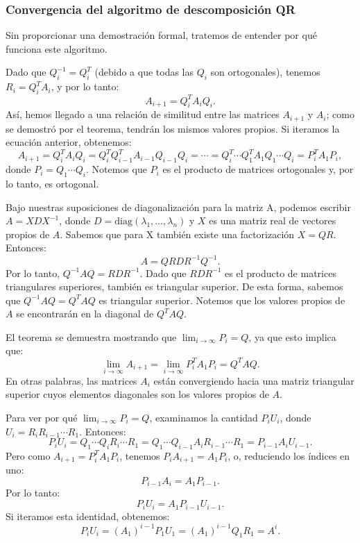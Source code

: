 \subsubsection{Convergencia del algoritmo de descomposición QR}
Sin proporcionar una demostración formal, tratemos de entender por qué funciona este algoritmo.
 
Dado que \( Q_i^{-1} = Q_i^T \) (debido a que todas las $Q_i$ son ortogonales), tenemos \( R_i = Q_i^T A_i \), y por lo tanto:
\[
A_{i+1} = Q_i^T A_i Q_i.
\]
Así, hemos llegado a una relación de similitud entre las matrices $A_ {i+1} $ y $A_i$; como se demostró por el teorema,  tendrán los mismos valores propios. Si iteramos la ecuación anterior, obtenemos:
\[
A_{i+1} = Q_i^T A_i Q_i = Q_i^T Q_{i-1}^T A_{i-1} Q_{i-1} Q_i = \cdots = Q_i^T \cdots Q_1^T A_1 Q_1 \cdots Q_i = P_i^T A_1 P_i,
\]
donde \( P_i = Q_1 \cdots Q_i \). Notemos que \( P_i \) es el producto de matrices ortogonales y, por lo tanto, es ortogonal.

Bajo nuestras suposiciones de diagonalización para la matriz A, podemos escribir \( A = X D X^{-1} \), donde \( D = \text{diag}(\lambda_1, \ldots, \lambda_n) \) y \( X \) es una matriz real de vectores propios de \( A \). Sabemos que para X también existe una factorización \( X = QR \). Entonces:
\[
A = Q R D R^{-1} Q^{-1}.
\]
Por lo tanto, \( Q^{-1} A Q = R D R^{-1} \).  
Dado que \( R D R^{-1} \) es el producto de matrices triangulares superiores, también es triangular superior. De esta forma, sabemos que \( Q^{-1} A Q = Q^T A Q \) es triangular superior. Notemos que los valores propios de \( A \) se encontrarán en la diagonal de \( Q^T A Q \).

El teorema se demuestra mostrando que \( \lim_{i \to \infty} P_i = Q \), ya que esto implica que:
\[
\lim_{i \to \infty} A_{i+1} = \lim_{i \to \infty} P_i^T A_1 P_i = Q^T A Q.
\]
En otras palabras, las matrices \( A_i \) están convergiendo hacia una matriz triangular superior cuyos elementos diagonales son los valores propios de \( A \).

Para ver por qué \( \lim_{i \to \infty} P_i = Q \), examinamos la cantidad \( P_i U_i \), donde \( U_i = R_i R_{i-1} \cdots R_1 \). Entonces:
\[
P_i U_i = Q_1 \cdots Q_i R_i \cdots R_1 = Q_1 \cdots Q_{i-1} A_i R_{i-1} \cdots R_1 = P_{i-1} A_i U_{i-1}.
\]
Pero como \( A_{i+1} = P_i^T A_1 P_i \), tenemos \( P_i A_{i+1} = A_1 P_i \), o, reduciendo los índices en uno:
\[
P_{i-1} A_i = A_1 P_{i-1}.
\]
Por lo tanto:
\[
P_i U_i = A_1 P_{i-1} U_{i-1}.
\]
Si iteramos esta identidad, obtenemos:
\[
P_i U_i = (A_1)^{i-1} P_1 U_1 = (A_1)^{i-1} Q_1 R_1 = A^i.
\]

